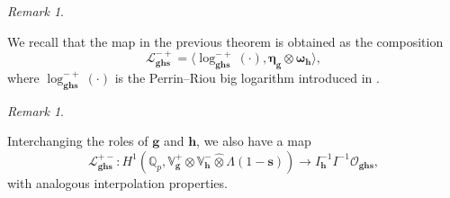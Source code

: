 \documentclass[a4paper,11pt]{amsart}
\theoremstyle{plain}
\theoremstyle{definition}
\theoremstyle{remark}
\newtheorem{remarkwr}[theorem]{Remark}
\newenvironment{remark}{\begin{remarkwr}\begin{upshape}}{\end{upshape}\end{remarkwr}}
\newcommand{\cl}{\mathcal}
\newcommand{\hg}{{\mathbf{g}}}
\newcommand{\hh}{{\mathbf h}}
\numberwithin{equation}{section}
\begin{document}





\begin{remark}
    We recall that the map in the previous theorem is obtained as the composition
    \[
    \mathcal L_{\hg \hh \mathbf{s}}^{-+} = \langle \log_{\hg \hh \mathbf{s}}^{-+}(\cdot), \bm{\eta}_{\hg} \otimes \bm{\omega}_{\hh} \rangle,
    \]
    where $\log_{\hg \hh \mathbf{s}}^{-+}(\cdot)$ is the Perrin--Riou big logarithm introduced in \cite[Theorem~8.2.8]{KLZ}. %
\end{remark}

\begin{remark}
    Interchanging the roles of $\hg$ and $\hh$, we also have a map
    \[
    \mathcal L_{\hg \hh\mathbf{s}}^{+-}: H^1(\mathbb Q_p, \mathbb V_{\hg}^+ \hat \otimes \mathbb V_{\hh}^- \hat \otimes \Lambda(1-\mathbf{s})) \rightarrow  I_{\hh}^{-1} I^{-1}\cl{O}_{\hg \hh \mathbf{s}},
    \]
    with analogous interpolation properties.
\end{remark}
\end{document}
